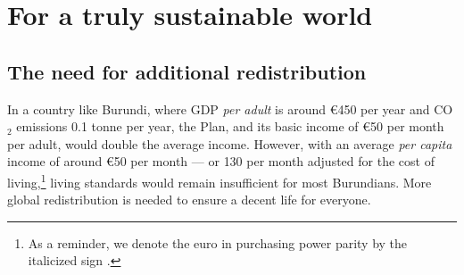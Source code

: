 \documentclass[a5paper,english,openany]{memoir}
\begin{document}
\section{For a truly sustainable world}

\subsection{The need for additional redistribution}
In a country like Burundi, where GDP \textit{per adult} is around \euro{}450 per year and CO$_\text{2}$ emissions 0.1 tonne per year, the %
Plan, %
and its basic income of \euro{}50 per month per adult, %
would double the average income. 
However, with an average \textit{per capita} income of around \euro{}50 per month --- or \textit{\texteuro{}}130 per month adjusted for the cost of living,\footnote{As a reminder, we denote the euro in purchasing power parity by the italicized sign \textit{\texteuro{}}.} 
living standards would remain insufficient for most Burundians. More global redistribution is needed to ensure a decent life for everyone. 
\end{document}
